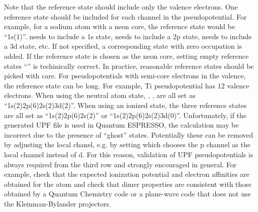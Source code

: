     Note that the reference state should include only the valence electrons.
    One reference state should be included for each channel in the pseudopotential.
    For example, for a sodium atom with a neon core, the reference state would be ``1s(1)''.
     needs to include a 1s state,  needs to include a 2p state,
     needs to include a 3d state, etc. If not specified, a corresponding state with zero occupation is added.
    If the reference state is chosen as the neon core, setting empty reference states ``'' is techinically correct.
    In practice, reasonable reference states should be picked with care.
    For pseudopotentials with semi-core electrons in the valence, the reference state can be long.
    For example, Ti pseudopotential has 12 valence electrons. When using the neutral atom state,
    , ,  are all set as ``1s(2)2p(6)2s(2)3d(2)''.
    When using an ionized state, the three reference states are all set as ``1s(2)2p(6)2s(2)'' or ``1s(2)2p(6)2s(2)3d(0)''.
    Unfortunately, if the generated UPF file is used in Quantum ESPRESSO, the calculation may be incorrect due to the presence of ``ghost'' states. Potentially these can be removed by adjusting the local chanel, e.g. by setting  which chooses the p channel as the local channel instead of d.
    For this reason, validation of UPF pseudopotentials is always required from the third row and strongly encouraged in general. For example, check that the expected ionization potential and electron affinities are obtained for the atom and check that dimer properties are consistent with those obtained by a Quantum Chemistry code or a plane-wave code that does not use the Kleinman-Bylander projectors.

    

